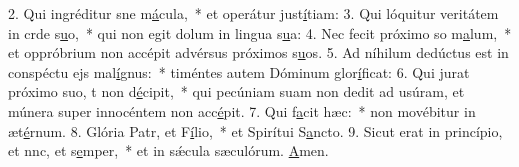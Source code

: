 2. Qui ingréditur sne m\uline{á}cula,~* et operátur just\uline{í}tiam:
3. Qui lóquitur veritátem in crde s\uline{u}o,~* qui non egit dolum in lingua s\uline{u}a:
4. Nec fecit próximo so m\uline{a}lum,~* et oppróbrium non accépit advérsus próximos s\uline{u}os.
5. Ad níhilum dedúctus est in conspéctu ejs mal\uline{í}gnus:~* timéntes autem Dóminum glor\uline{í}ficat:
6. Qui jurat próximo suo, t non d\uline{é}cipit,~* qui pecúniam suam non dedit ad usúram, et múnera super innocéntem non acc\uline{é}pit.
7. Qui f\uline{a}cit hæc:~* non movébitur in æt\uline{é}rnum.
8. Glória Patr, et F\uline{í}lio,~* et Spirítui S\uline{a}ncto.
9. Sicut erat in princípio, et nnc, et s\uline{e}mper,~* et in sǽcula sæculórum. \uline{A}men.
